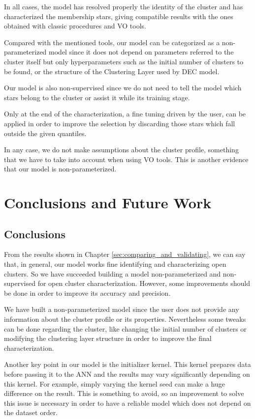 \documentclass[11pt, a4paper, english]{book}
\begin{document}
In all cases, the model has resolved properly the identity of the cluster
and has characterized the membership stars,
giving compatible results with the ones obtained with classic procedures and VO tools.

Compared with the mentioned tools, our model can be categorized as a non-parameterized
model since it does not depend on parameters referred to the cluster itself
but only hyperparameters such as the initial number of clusters to be found,
or the structure of the Clustering Layer used by DEC model.

Our model is also non-supervised since we do not need to tell the model
which stars belong to the cluster or assist it while its training stage.

Only at the end of the characterization, a fine tuning driven by the user,
can be applied in order to improve the selection by discarding those
stars which fall outside the given quantiles.

In any case, we do not make assumptions about the cluster profile,
something that we have to take into account when using VO tools.
This is another evidence that our model is non-parameterized.

\chapter{Conclusions and Future Work}

\section{Conclusions}

From the results shown in Chapter \ref{sec:comparing_and_validating},
we can say that, in general, our model works fine identifying and characterizing open clusters.
So we have succeeded building a model non-parameterized and non-supervised for open cluster characterization.
However, some improvements should be done in order to improve its accuracy and precision.

We have built a non-parameterized model since the user does not provide any information
about the cluster profile or its properties.
Nevertheless some tweaks can be done regarding the cluster,
like changing the initial number of clusters or modifying the clustering layer structure
in order to improve the final characterization.

Another key point in our model is the initializer kernel.
This kernel prepares data before passing it to the ANN
and the results may vary significantly depending on this kernel.
For example, simply varying the kernel seed can make a huge difference on the result.
This is something to avoid, so an improvement to solve this issue is necessary in order
to have a reliable model which does not depend on the dataset order.
\end{document}
